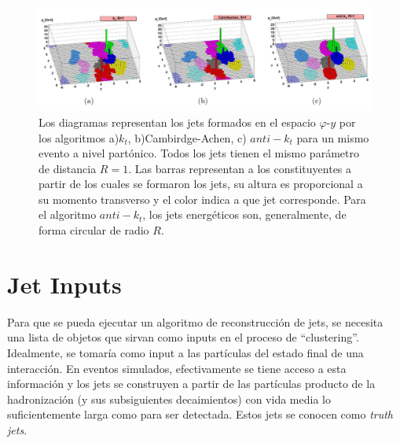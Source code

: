 \begin{figure}[h]
    \centering
    \includegraphics[width =\linewidth]{images/algos}
    \caption{ Los diagramas representan los jets formados en el espacio $\varphi$-$y$ por los algoritmos a)$k_t$, b)Cambirdge-Achen, c) $anti-k_t$ para un mismo evento a nivel partónico. Todos los jets tienen el mismo parámetro de distancia $R=1$\cite{antiKtalgo}. Las barras representan a los constituyentes a partir de los cuales se formaron los jets, su altura es proporcional a su momento transverso y el color indica a que jet corresponde. Para el algoritmo $anti-k_t$, los jets energéticos son, generalmente, de forma circular de radio $R$. }
    \label{fig:algos}
\end{figure}


\section{Jet Inputs} \label{JetInputs}
Para que se pueda ejecutar un algoritmo de reconstrucción de jets, se necesita una lista de objetos que sirvan como inputs en el proceso de ``clustering''. Idealmente, se tomaría como input a las partículas del estado final de una interacción. En eventos simulados, efectivamente se tiene acceso a esta información y los jets se construyen a partir de las partículas producto de la hadronización (y sus subsiguientes decaimientos) con vida media lo suficientemente larga como para ser detectada. Estos jets se conocen como \textit{truth jets}. 

